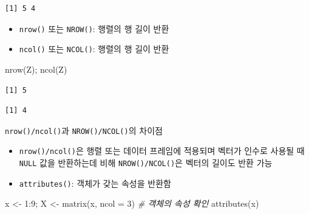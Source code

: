 \documentclass[
  11pt,
]{krantz}
\makeatletter
\newenvironment{Shaded}{\begin{snugshade}}{\end{snugshade}}
\newcommand{\AttributeTok}[1]{\textcolor[rgb]{0.61,0.61,0.61}{#1}}
\newcommand{\CommentTok}[1]{\textcolor[rgb]{0.37,0.37,0.37}{\textit{#1}}}
\newcommand{\DecValTok}[1]{\textcolor[rgb]{0.06,0.06,0.06}{#1}}
\newcommand{\FunctionTok}[1]{\textcolor[rgb]{0,0,0}{#1}}
\newcommand{\NormalTok}[1]{#1}
\newcommand{\OtherTok}[1]{\textcolor[rgb]{0.37,0.37,0.37}{#1}}
\newcommand{\SpecialCharTok}[1]{\textcolor[rgb]{0,0,0}{#1}}
\providecommand{\tightlist}{%
  \setlength{\itemsep}{0pt}\setlength{\parskip}{0pt}}
\newenvironment{kframe}{%
\medskip{}
\setlength{\fboxsep}{.8em}
 \def\at@end@of@kframe{}%
 \ifinner\ifhmode%
  \def\at@end@of@kframe{\end{minipage}}%
  \begin{minipage}{\columnwidth}%
 \fi\fi%
 \def\FrameCommand##1{\hskip\@totalleftmargin \hskip-\fboxsep
 \colorbox{shadecolor}{##1}\hskip-\fboxsep
     \hskip-\linewidth \hskip-\@totalleftmargin \hskip\columnwidth}%
 \MakeFramed {\advance\hsize-\width
   \@totalleftmargin\z@ \linewidth\hsize
   \@setminipage}}%
 {\par\unskip\endMakeFramed%
 \at@end@of@kframe}
\renewenvironment{quote}{\begin{kframe}}{\end{kframe}}
\makeatother
\begin{document}
\begin{verbatim}
[1] 5 4
\end{verbatim}

\normalsize

\begin{itemize}
\tightlist
\item
  \texttt{nrow()} 또는 \texttt{NROW()}: 행렬의 행 길이 반환
\item
  \texttt{ncol()} 또는 \texttt{NCOL()}: 행렬의 행 길이 반환
\end{itemize}

\footnotesize

\begin{Shaded}
\begin{Highlighting}[]
\FunctionTok{nrow}\NormalTok{(Z); }\FunctionTok{ncol}\NormalTok{(Z)}
\end{Highlighting}
\end{Shaded}

\begin{verbatim}
[1] 5
\end{verbatim}

\begin{verbatim}
[1] 4
\end{verbatim}

\normalsize

\begin{quote}
\texttt{nrow()/ncol()}과 \texttt{NROW()/NCOL()}의 차이점

\begin{itemize}
\tightlist
\item
  \texttt{nrow()/ncol()}은 행렬 또는 데이터 프레임에 적용되며 벡터가 인수로 사용될 때 \texttt{NULL} 값을 반환하는데 비해 \texttt{NROW()/NCOL()}은 벡터의 길이도 반환 가능
\end{itemize}
\end{quote}

\begin{itemize}
\tightlist
\item
  \texttt{attributes()}: 객체가 갖는 속성을 반환함
\end{itemize}

\footnotesize

\begin{Shaded}
\begin{Highlighting}[]
\NormalTok{x }\OtherTok{\textless{}{-}} \DecValTok{1}\SpecialCharTok{:}\DecValTok{9}\NormalTok{; X }\OtherTok{\textless{}{-}} \FunctionTok{matrix}\NormalTok{(x, }\AttributeTok{ncol =} \DecValTok{3}\NormalTok{)}
\CommentTok{\# 객체의 속성 확인}
\FunctionTok{attributes}\NormalTok{(x)}
\end{Highlighting}
\end{Shaded}
\end{document}
